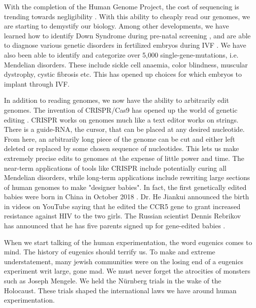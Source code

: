 With the completion of the Human Genome Project, the cost of sequencing is trending towards negligibility \cite{Wetterstrand2019}.
With this ability to cheaply read our genomes, we are starting to demystify our biology.
Among other developments, we have learned how to identify Down Syndrome during pre-natal screening \cite{Natoli2012}, and are able to diagnose various genetic disorders in fertilized embryos during IVF \cite{Rycke2017}.
We have also been able to identify and categorize over 5,000 single-gene-mutations, i.e. Mendelian disorders.
These include sickle cell anaemia, color blindness, muscular dystrophy, cystic fibrosis etc.
This has opened up choices for which embryos to implant through IVF.

In addition to reading genomes, we now have the ability to arbitrarily edit genomes.
The invention of CRISPR/Cas9 has opened up the world of genetic editing \cite{Zhang2014}.
CRISPR works on genomes much like a text editor works on strings.
There is a guide-RNA, the cursor, that can be placed at any desired nucleotide.
From here, an arbitrarily long piece of the genome can be cut and either left deleted or replaced by some chosen sequence of nucleotides.
This lets us make extremely precise edits to genomes at the expense of little power and time.
The near-term applications of tools like CRISPR include potentially curing all Mendelian disorders, while long-term applications include rewriting large sections of human genomes to make "designer babies".
In fact, the first genetically edited babies were born in China in October 2018 \cite{crisprbabies2018}.
Dr. He Jiankui announced the birth in videos on YouTube saying that he edited the CCR5 gene to grant increased resistance against HIV to the two girls.
The Russian scientist Dennis Rebrikov has announced that he has five parents signed up for gene-edited babies \cite{Cohen2019}.

When we start talking of the human experimentation, the word eugenics comes to mind.
The history of eugenics should terrify us.
To make and extreme understatement, many jewish communities were on the losing end of a eugenics experiment writ large, gone mad.
We must never forget the atrocities of monsters such as Joseph Mengele.
We held the N\"urnberg trials in the wake of the Holocaust.
These trials shaped the international laws we have around human experimentation.
